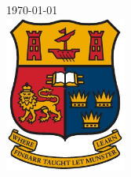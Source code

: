 \documentclass[12pt,a4paper,oneside,oldfontcommands]{memoir}
\begin{document}
\begin{page}


{\large \today}\\[2cm] %

\includegraphics[width=4cm]{images/ucc.jpeg}

\vfill %

\end{page}


\cleardoublepage

\tableofcontents*{\listfigurename}
\listoffigures


\clearpage

\end{document}

